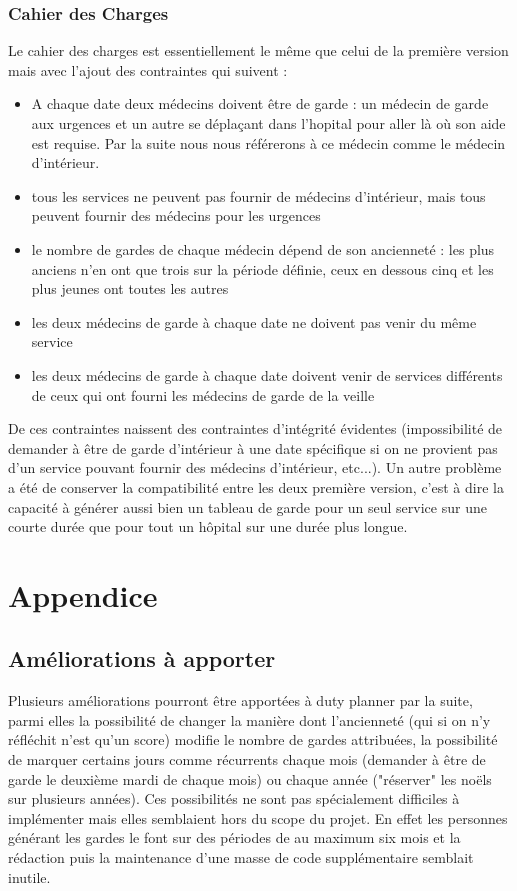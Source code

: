 \documentclass[11pt]{report}
\begin{document}
\subsection{Cahier des Charges}
Le cahier des charges est essentiellement le même que celui de la première version mais avec l'ajout des contraintes qui suivent : 
\begin{itemize}
\item A chaque date deux médecins doivent être de garde : un médecin de garde aux urgences et un autre se déplaçant dans l'hopital pour aller là où son aide est requise.
Par la suite nous nous référerons à ce médecin comme le médecin d'intérieur.
\item tous les services ne peuvent pas fournir de médecins d'intérieur, mais tous peuvent fournir des médecins pour les urgences
\item le nombre de gardes de chaque médecin dépend de son ancienneté : les plus anciens n'en ont que trois sur la période définie, ceux en dessous cinq et les plus jeunes ont toutes les autres
\item les deux médecins de garde à chaque date ne doivent pas venir du même service
\item les deux médecins de garde à chaque date doivent venir de services différents de ceux qui ont fourni les médecins de garde de la veille
\end{itemize}

De ces contraintes naissent des contraintes d'intégrité évidentes (impossibilité de demander à être de garde d'intérieur à une date spécifique si on ne provient pas d'un service pouvant fournir des médecins d'intérieur, etc...).
Un autre problème a été de conserver la compatibilité entre les deux première version, c'est à dire la capacité à générer aussi bien un tableau de garde pour un seul service sur une courte durée que pour tout un hôpital sur une durée plus longue.

\chapter{Appendice}
\section{Améliorations à apporter}
Plusieurs améliorations pourront être apportées à duty planner par la suite, parmi elles la possibilité de changer la manière dont l'ancienneté (qui si on n'y réfléchit n'est qu'un score) modifie le nombre de gardes attribuées, la possibilité de marquer certains jours comme récurrents chaque mois (demander à être de garde le deuxième mardi de chaque mois) ou chaque année ("réserver" les noëls sur plusieurs années). Ces possibilités ne sont pas spécialement difficiles à implémenter mais elles semblaient hors du scope du projet. En effet les personnes générant les gardes le font sur des périodes de au maximum six mois et la rédaction puis la maintenance d'une masse de code supplémentaire semblait inutile\cite{yagn}.
\end{document}
